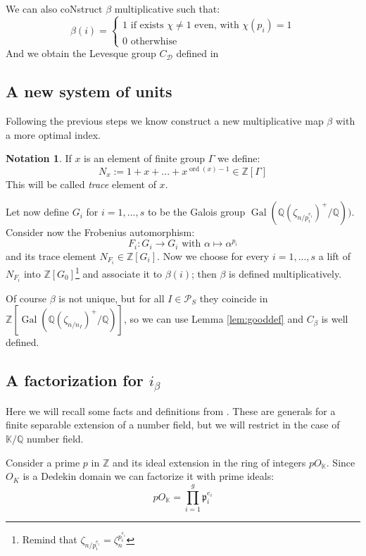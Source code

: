 \documentclass[]{article}
\theoremstyle{plain}
\theoremstyle{remark}
\theoremstyle{definition}
\newtheorem*{nota}{Notation}
\newcommand{\PS}{\mathcal{P}_S}
\newcommand{\Z}{\mathbb{Z}}
\newcommand{\K}{\mathbb{K}}
\newcommand{\Q}{\mathbb{Q}}
\DeclareMathOperator{\Gal}{Gal}
\DeclareMathOperator{\ord}{ord}
\begin{document}
	We can also coNstruct $\beta$ multiplicative such that:
	\[ \beta(i) = \begin{cases} 1 \text{ if exists } \chi \neq 1 \text{ even, with } \chi(p_i)=1 \\ 0 \text{ otherwhise } \end{cases}\]
	And we obtain the Levesque group $ C_\mathcal{D} $ defined in \cite[Page~331]{LEV}
	
	\subsection{A new system of units}
	
	Following the previous steps we know construct a new multiplicative map $\beta$ with a more optimal index. 
	\begin{nota}
		If $ x $ is an element of finite group $\Gamma$ we define:
		\[ N_x := 1 + x + ... + x^{\ord (x) - 1} \in \Z[\Gamma]\]
		This will be called \textit{trace} element of $ x $.
	\end{nota}

	Let now define $ G_i $ for $ i=1,...,s $ to be the Galois group $ \Gal ( \Q(\zeta_{n/p_i^{e_i}})^+ / \Q)) $. Consider now the Frobenius automorphism:  
	\[ F_i : G_i \to G_i \text{ with }  \alpha \mapsto \alpha ^ {p_i}\]
	and its trace element $ N_{F_i} \in \Z [G_i]$. Now we choose for every $ i=1, ... , s $ a lift of $ N_{F_i} $ into $ \Z[G_0] $\footnote{Remind that $ \zeta_{n/p_i^{e_i}} = \zeta_n^{p_i^{e_i}}$} and associate it to $\beta(i)$; then $\beta$ is defined multiplicatively. 
	
	Of course $\beta$ is not unique, but for all $ I \in \PS $ they coincide in $ \Z[\Gal( \Q(\zeta_{n/n_I})^+ / \Q   )]  $, so we can use Lemma \ref{lem:gooddef} and $ C_\beta $ is well defined. 
	
	\subsection{A factorization for $ i_\beta $}
	
	Here we will recall some facts and definitions from \cite[Chapter~11]{RIN}. These are generals for a finite separable extension of a number field, but we will restrict in the case of $ \K / \Q$ number field. 
	
	Consider a prime $ p $ in $ \Z $ and its ideal extension in the ring of integers $ pO_\K $. Since $ O_K $ is a Dedekin domain we can factorize it with prime ideals:
	\begin{equation}\label{eq:fact_p}
		pO_\K = \prod_{i=1}^g \mathfrak{p}_i^{e_i}
	\end{equation} 
	
\end{document}
